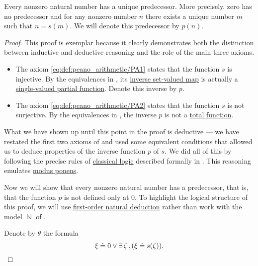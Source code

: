 \begin{proposition}\label{thm:nonzero_natural_numbers_have_predecessors}
  Every nonzero natural number has a unique predecessor. More precisely, zero has no predecessor and for any nonzero number \( n \) there exists a unique number \( m \) such that \( n = s(m) \). We will denote this predecessor by \( p(n) \).
\end{proposition}
\begin{proof}
  This proof is exemplar because it clearly demonstrates both the distinction between inductive and deductive reasoning and the role of the main three axioms.

  \begin{itemize}
    \item The axiom \eqref{eq:def:peano_arithmetic/PA1} states that the function \( s \) is injective. By the equivalences in , its \hyperref[def:set_valued_map/inverse]{inverse set-valued map} is actually a \hyperref[def:set_valued_map/partial]{single-valued partial function}. Denote this inverse by \( p \).

    \item The axiom \eqref{eq:def:peano_arithmetic/PA2} states that the function \( s \) is not surjective. By the equivalences in , the inverse \( p \) is not a \hyperref[def:set_valued_map/partial]{total function}.
  \end{itemize}

  What we have shown up until this point in the proof is deductive --- we have restated the first two axioms of  and used some equivalent conditions that allowed us to deduce properties of the inverse function \( p \) of \( s \). We did all of this by following the precise rules of \hyperref[rem:classical_logic]{classical logic} described formally in . This reasoning emulates \hyperref[eq:def:def:axiomatic_deductive_system/mp]{modus ponens}.

  Now we will show that every nonzero natural number has a predecessor, that is, that the function \( p \) is not defined only at \( 0 \). To highlight the logical structure of this proof, we will use \hyperref[def:first_order_natural_deduction_system]{first-order natural deduction} rather than work with the model \( \BbbN \) of .

  Denote by \( \theta \) the formula
  \begin{equation*}
    \xi \doteq 0 \vee \exists \thinspace \zeta \thinspace . \thinspace (\xi \doteq s(\zeta)).
  \end{equation*}


\end{proof}
